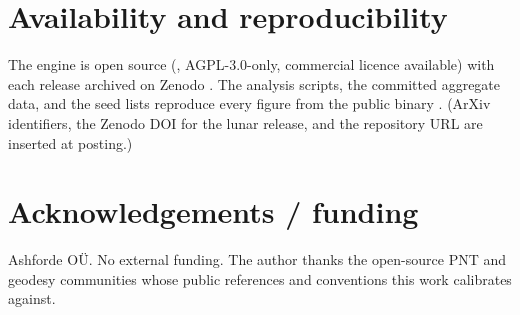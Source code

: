 \section{Availability and reproducibility}

The engine is open source (, AGPL-3.0-only, commercial licence
available) with each release archived on Zenodo \citep{baweja2026kshana}. The
analysis scripts, the committed aggregate data, and the seed lists reproduce
every figure from the public binary \citep{fernandezprades2018reproducibility}.
(ArXiv identifiers, the Zenodo DOI for the lunar release, and the repository URL
are inserted at posting.)

\section*{Acknowledgements / funding}

Ashforde O\"U. No external funding. The author thanks the open-source PNT and
geodesy communities whose public references and conventions this work calibrates
against.
